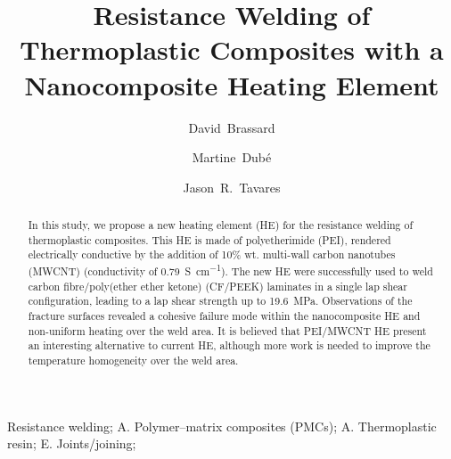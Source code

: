 \documentclass[11pt,review,times]{elsarticle}
\begin{document}


\title{Resistance Welding of Thermoplastic Composites with a Nanocomposite Heating Element}

\author[polymtl,crepec]{David~Brassard}
\author[ets,crepec]{Martine~Dubé}
\author[polymtl,crepec]{Jason~R.~Tavares}


\address[polymtl]{Department of Chemical Engineering, Polytechnique Montréal, P.O. Box 6079 Station Centre-Ville, Montréal, QC, H3C 3A7, Canada}
\address[ets]{Department of Mechanical Engineering, École de technologie supérieure, 1100 Notre-Dame Street West, Montréal, Québec, Canada, H3C 1K3}
\address[crepec]{Research Center for High Performance Polymer and Composite Systems (CREPEC), Polytechnique Montréal, P.O. Box 6079 Station Centre-Ville, Montréal, QC, H3C 3A7, Canada}

\begin{abstract}

In this study, we propose a new heating element (HE) for the resistance welding of thermoplastic composites. 
This HE is made of polyetherimide (PEI), rendered electrically conductive by the addition of 10\% wt. multi-wall carbon nanotubes (MWCNT) (conductivity of \SI{0.79}{\siemens\per\cm}).
The new HE were successfully used to weld carbon fibre/poly(ether ether ketone) (CF/PEEK) laminates in a single lap shear configuration, leading to a lap shear strength up to \SI{19.6}{\mega\pascal}.
Observations of the fracture surfaces revealed a cohesive failure mode within the nanocomposite HE and non-uniform heating over the weld area. 
It is believed that PEI/MWCNT HE present an interesting alternative to current HE, although more work is needed to improve the temperature homogeneity over the weld area.

\end{abstract}

\begin{keyword}
Resistance welding;  A. Polymer–matrix composites (PMCs);  A. Thermoplastic resin;  E. Joints/joining;  
\end{keyword}

\maketitle
\end{document}
